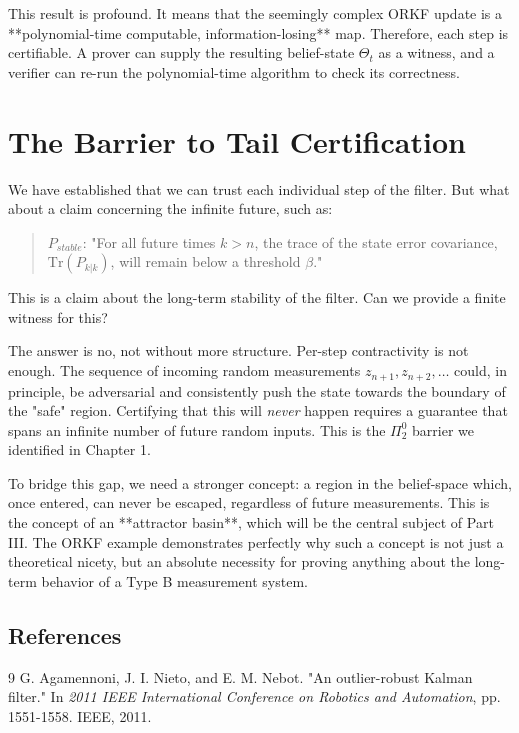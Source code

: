 \documentclass[12pt]{article}
\theoremstyle{definition}
\theoremstyle{plain}
\begin{document}
This result is profound. It means that the seemingly complex ORKF update is a **polynomial-time computable, information-losing** map. Therefore, each step is certifiable. A prover can supply the resulting belief-state $\Theta_t$ as a witness, and a verifier can re-run the polynomial-time algorithm to check its correctness.

\section{The Barrier to Tail Certification}
We have established that we can trust each individual step of the filter. But what about a claim concerning the infinite future, such as:
\begin{quote}
$P_{stable}$: "For all future times $k > n$, the trace of the state error covariance, $\mathrm{Tr}(P_{k|k})$, will remain below a threshold $\beta$."
\end{quote}
This is a claim about the long-term stability of the filter. Can we provide a finite witness for this?

The answer is no, not without more structure. Per-step contractivity is not enough. The sequence of incoming random measurements $z_{n+1}, z_{n+2}, \dots$ could, in principle, be adversarial and consistently push the state towards the boundary of the "safe" region. Certifying that this will \emph{never} happen requires a guarantee that spans an infinite number of future random inputs. This is the $\Pi^0_2$ barrier we identified in Chapter 1.

To bridge this gap, we need a stronger concept: a region in the belief-space which, once entered, can never be escaped, regardless of future measurements. This is the concept of an **attractor basin**, which will be the central subject of Part III. The ORKF example demonstrates perfectly why such a concept is not just a theoretical nicety, but an absolute necessity for proving anything about the long-term behavior of a Type B measurement system.

\subsection*{References}
\begin{thebibliography}{9}
G. Agamennoni, J. I. Nieto, and E. M. Nebot. "An outlier-robust Kalman filter." In \textit{2011 IEEE International Conference on Robotics and Automation}, pp. 1551-1558. IEEE, 2011.
\end{thebibliography}
\end{document}
